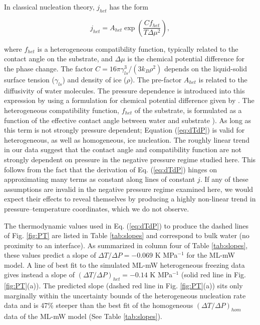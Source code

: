 \documentclass[journal abbreviation, manuscript]{copernicus}
\begin{document}
In classical nucleation theory, $j_{het}$ has the form \citep{lamb2011physics}

\begin{equation} \label{eq:R}
    j_{het} = A_{het} \exp \! \left(\frac{C f_{het}}{T\Delta \mu ^2} \right),
\end{equation}

\noindent where $f_{het}$ is a heterogeneous compatibility function, typically related to the contact angle on the substrate, and $\Delta \mu$ is the chemical potential difference for the phase change. The factor $C = 16 \pi \gamma_{ls}^3 / (3 k_B \rho^2)$ depends on the liquid-solid surface tension ($\gamma_{ls}$) and density of ice ($\rho$). The pre-factor $A_{het}$ is related to the diffusivity of water molecules. The pressure dependence is introduced into this expression by using a formulation for chemical potential difference given by \citet{nemec2013}.
The heterogeneous compatibility function, $f_{het}$ of the substrate, is formulated as a function of the effective contact angle between water and substrate \citep{lamb2011physics, zobrist2007}). As long as this term is not strongly pressure dependent; Equation (\ref{eq:dTdP}) is valid for heterogeneous, as well as homogeneous, ice nucleation. The roughly linear trend in our data suggest that the contact angle and compatibility function are not strongly dependent on pressure in the negative pressure regime studied here. This follows from the fact that the derivation of Eq. (\ref{eq:dTdP}) hinges on approximating many terms as constant along lines of constant $j$. If any of these assumptions are invalid in the negative pressure regime examined here, we would expect their effects to reveal themselves by producing a highly non-linear trend in pressure--temperature coordinates, which we do not observe. 

The thermodynamic values used in Eq. (\ref{eq:dTdP}) to produce the dashed lines of Fig. \ref{fig:PT} are listed in Table \ref{tab:slopes} and correspond to bulk water (no proximity to an interface). As summarized in column four of Table \ref{tab:slopes}, these values predict a slope of $\Delta T/\Delta P = -0.069$ K MPa$^{-1}$ for the ML-mW model. A line of best fit to the simulated ML-mW heterogeneous freezing data gives instead a slope of $(\Delta T/\Delta P)_{het} = -0.14$ K MPa$^{-1}$ (solid red line in Fig. \ref{fig:PT}(a)). The predicted slope (dashed red line in Fig. \ref{fig:PT}(a)) sits only marginally within the uncertainty bounds of the heterogeneous nucleation rate data and is 47\% steeper than the best fit of the homogeneous $(\Delta T/\Delta P)_{hom}$ data of the ML-mW model (See Table \ref{tab:slopes}).
\end{document}
